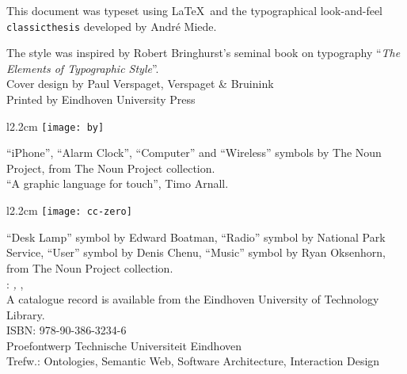 \thispagestyle{empty}

\hfill

\vfill

\noindent
This document was typeset using \LaTeX~and the typographical look-and-feel \texttt{classicthesis} developed by Andr\'e Miede.
 
The style was inspired by Robert Bringhurst's seminal book on typography ``\emph{The Elements of Typographic Style}''.\\

\noindent
Cover design by Paul Verspaget, Verspaget \& Bruinink\\

\noindent
Printed by Eindhoven University Press\\

\begin{wrapfigure}{l}{2.2cm} %
\centering
\texttt{[image: by]}
\end{wrapfigure}

\noindent
``iPhone'', ``Alarm Clock'', ``Computer'' and ``Wireless'' symbols by The Noun Project, from The Noun Project collection.\\
``A graphic language for touch'', Timo Arnall.\\

\begin{wrapfigure}{l}{2.2cm} 
\centering
\texttt{[image: cc-zero]}
\end{wrapfigure}

\noindent
``Desk Lamp'' symbol by Edward Boatman, ``Radio'' symbol by National Park Service, ``User'' symbol by Denis Chenu, ``Music'' symbol by Ryan Oksenhorn, from The Noun Project collection.\\


\noindent\myName: \textit{\myTitle,} \mySubtitle, %
\textcopyright\ \myTime\\

\noindent
A catalogue record is available from the Eindhoven University of Technology Library.\\
ISBN: 978-90-386-3234-6\\

\noindent
Proefontwerp Technische Universiteit Eindhoven\\
Trefw.: Ontologies, Semantic Web, Software Architecture, Interaction Design


%
%
%
%
%
